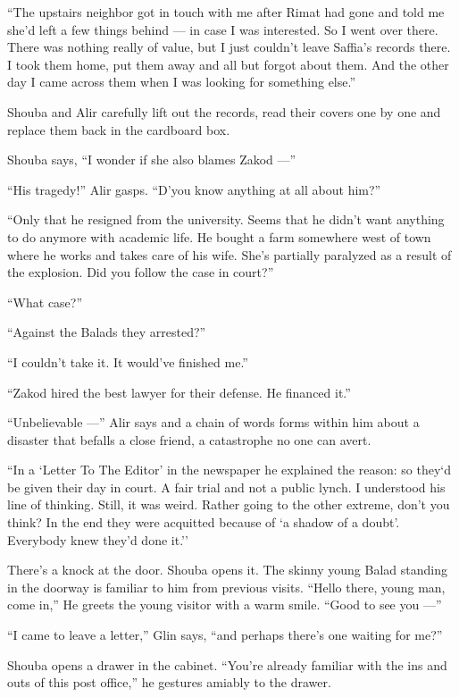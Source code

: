 \documentclass[twoside,11pt,openany]{book}
\begin{document}
``The upstairs neighbor got in touch with me after Rimat had gone and told me she'd left a few things
behind --- in case I was interested. So I went over there. There was nothing really of value, but I just couldn't leave
Saffia's records there. I took them home, put them away and all but forgot about them. And the other day I came across
them when I was looking for something else.''

Shouba and Alir carefully lift out the records, read their covers one by one and replace them back in the cardboard
box.

Shouba says, ``I wonder if she also blames Zakod ---''

``His tragedy!'' Alir gasps. ``D'you know anything at all about
him?''

``Only that he resigned from the university. Seems that he didn't want
anything to do anymore with academic life. He
bought a farm somewhere west of town where he works and takes care of his wife. She's partially paralyzed as a result
of the explosion. Did you follow the case in court?''

``What case?''

``Against the Balads they arrested?''

``I couldn't take it. It would've finished me.''

``Zakod hired the best lawyer for their defense. He financed it.''

``Unbelievable ---'' Alir says and a chain of words forms within him about a disaster that
befalls a close friend, a catastrophe no one can avert.

``In a `Letter To The Editor' in the newspaper he explained the reason: so they`d be given their day
in court. A fair trial and not a public lynch. I understood his line of thinking. Still, it was weird. Rather going to
the other extreme, don't you think?{  }In the end they were acquitted because
of `a shadow of a doubt'. Everybody knew they'd done it.''

There's a knock at the door. Shouba opens it. The skinny young Balad standing in the doorway is familiar to him from
previous visits. ``Hello there, young man, come in,'' He greets the young visitor with a
warm smile. ``Good to see you ---''

``I came to leave a letter,'' Glin says, ``and perhaps there's one waiting for
me?''

Shouba opens a drawer in the cabinet. ``You're already familiar with the ins and outs of this post
office,'' he gestures amiably to the drawer.
\end{document}
